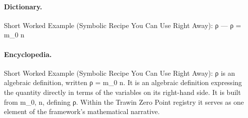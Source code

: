 \paragraph{Dictionary.}
Short Worked Example (Symbolic Recipe You Can Use Right Away): ρ — ρ = m\_0 n

\paragraph{Encyclopedia.}
Short Worked Example (Symbolic Recipe You Can Use Right Away): ρ is an algebraic definition, written ρ = m\_0 n. It is an algebraic definition expressing the quantity directly in terms of the variables on its right-hand side. It is built from m\_0, n, defining ρ. Within the Trawin Zero Point registry it serves as one element of the framework's mathematical narrative.
